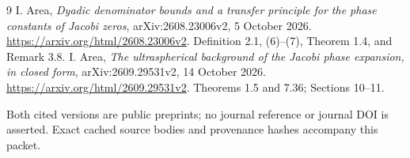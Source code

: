 \documentclass[11pt]{article}
\begin{document}
\begin{thebibliography}{9}
 I. Area, \emph{Dyadic denominator bounds and a transfer principle for the phase constants of Jacobi zeros}, arXiv:2608.23006v2, 5 October 2026. \url{https://arxiv.org/html/2608.23006v2}. Definition 2.1, (6)--(7), Theorem 1.4, and Remark 3.8.
 I. Area, \emph{The ultraspherical background of the Jacobi phase expansion, in closed form}, arXiv:2609.29531v2, 14 October 2026. \url{https://arxiv.org/html/2609.29531v2}. Theorems 1.5 and 7.36; Sections 10--11.
\end{thebibliography}
Both cited versions are public preprints; no journal reference or journal DOI is asserted. Exact cached source bodies and provenance hashes accompany this packet.
\end{document}
